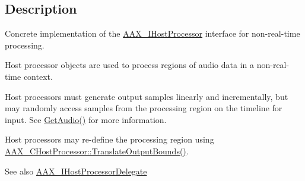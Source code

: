 \subsection{Description}
Concrete implementation of the \hyperlink{a00101}{A\+A\+X\+\_\+\+I\+Host\+Processor} interface for non-\/real-\/time processing. 

Host processor objects are used to process regions of audio data in a non-\/real-\/time context.
\begin{DoxyItemize}
\item Host processors must generate output samples linearly and incrementally, but may randomly access samples from the processing region on the timeline for input. See \hyperlink{a00102_aa7d5eb30282956a40ed34acc5881298c}{Get\+Audio()} for more information.
\item Host processors may re-\/define the processing region using \hyperlink{a00020_a4d793e60071069e6f98c4d841d37ac96}{A\+A\+X\+\_\+\+C\+Host\+Processor\+::\+Translate\+Output\+Bounds()}.
\end{DoxyItemize}

\begin{DoxySeeAlso}{See also}
\hyperlink{a00102}{A\+A\+X\+\_\+\+I\+Host\+Processor\+Delegate} 
\end{DoxySeeAlso}
